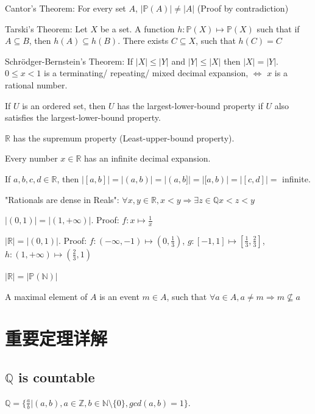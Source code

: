 \documentclass[12pt,a4paper]{ctexrep}
\begin{document}
Cantor's Theorem:
For every set $A$, $|\mathbb{P}(A)| \neq |A|$ (Proof by contradiction)

Tarski's Theorem:
Let $X$ be a set. A function $h: \mathbb{P}(X)\mapsto \mathbb{P}(X)$ such that if $A \subseteq B$, then $h(A) \subseteq h(B)$. There exists $C \subseteq X$, such that $h(C)=C$

Schr\"odger-Bernstein's Theorem:
If $|X| \leqslant |Y|$ and $|Y| \leqslant |X|$ then $|X| = |Y|$.\\

$0\leqslant x < 1$ is a terminating/ repeating/ mixed decimal expansion, $\iff$ $x$ is a rational number.

If $U$ is an ordered set, then $U$ has the largest-lower-bound property if $U$ also satisfies the largest-lower-bound property.

$\mathbb{R}$ has the supremum property (Least-upper-bound property).

Every number $x\in \mathbb{R}$ has an infinite decimal expansion.

If $a,b,c,d \in \mathbb{R}$, then $|[a,b]| = |(a,b)| = |(a,b]| = |[a,b)| = |[c,d]| = $ infinite.

"Rationals are dense in Reals": $\forall x,y \in \mathbb{R}, x<y \Rightarrow \exists z \in \mathbb{Q} x<z<y$

$|(0,1)| = |(1,+\infty)|$. Proof: $f: x \mapsto \frac{1}{x}$

$|\mathbb{R}| = |(0,1)|$. Proof: $f: (-\infty,-1)\mapsto(0,\frac{1}{3})$, $g: [-1,1]\mapsto[\frac{1}{3},\frac{2}{3}]$, $h: (1,+\infty)\mapsto(\frac{2}{3},1)$

$|\mathbb{R}| = |\mathbb{P}(\mathbb{N})|$

A maximal element of $A$ is an event $m \in A$, such that $\forall a \in A, a \neq m \Rightarrow m \nsubseteq a$

\section{重要定理详解}
\subsection{$\mathbb{Q}$ is countable} 
$\mathbb{Q} = \{\frac{a}{b}|(a,b),a \in \mathbb{Z},b\in \mathbb{N}\setminus\{0\},gcd(a,b) = 1\}$. 
\end{document}
